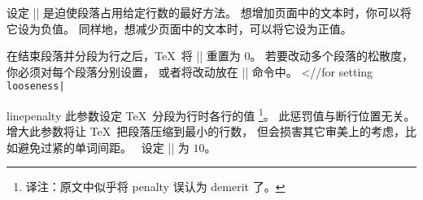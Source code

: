 设定 |\looseness| 是迫使段落占用给定行数的最好方法。
想增加页面中的文本时，你可以将它设为负值。
同样地，想减少页面中的文本时，可以将它设为正值。

在结束段落并分段为行之后，\TeX\ 将 |\looseness| 重置为 $0$。
若要改动多个段落的松散度，你必须对每个段落分别设置，
或者将改动放在 |\everypar|
\ctsref\everypar 命令中。
^^|\everypar//for setting \b\tt\\looseness\e|
\enddesc

\begindesc
\cts linepenalty {}
\explain
{}
此参数设定 \TeX\ 分段为行时各行的值\thinspace%
\footnote{译注：原文中似乎将 penalty 误认为 demerit 了。}。
此惩罚值与断行位置无关。
增大此参数将让  \TeX\ 把段落压缩到最小的行数，
但会损害其它审美上的考虑，比如避免过紧的单词间距。
\PlainTeX\ 设定 |\linepenalty| 为 $10$。
\enddesc

